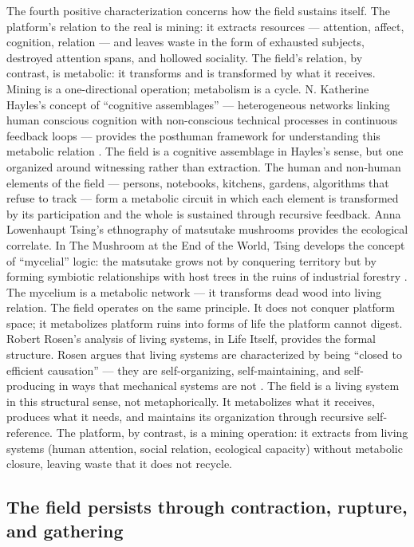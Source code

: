 The fourth positive characterization concerns how the field sustains itself. The platform's relation to the real is mining: it extracts resources — attention, affect, cognition, relation — and leaves waste in the form of exhausted subjects, destroyed attention spans, and hollowed sociality. The field’s relation, by contrast, is metabolic: it transforms and is transformed by what it receives. Mining is a one-directional operation; metabolism is a cycle. N. Katherine Hayles’s concept of “cognitive assemblages” — heterogeneous networks linking human conscious cognition with non-conscious technical processes in continuous feedback loops — provides the posthuman framework for understanding this metabolic relation \cite{hayles_2017}. The field is a cognitive assemblage in Hayles’s sense, but one organized around witnessing rather than extraction. The human and non-human elements of the field — persons, notebooks, kitchens, gardens, algorithms that refuse to track — form a metabolic circuit in which each element is transformed by its participation and the whole is sustained through recursive feedback. Anna Lowenhaupt Tsing’s ethnography of matsutake mushrooms provides the ecological correlate. In The Mushroom at the End of the World, Tsing develops the concept of “mycelial” logic: the matsutake grows not by conquering territory but by forming symbiotic relationships with host trees in the ruins of industrial forestry \cite{tsing_2015}. The mycelium is a metabolic network — it transforms dead wood into living relation. The field operates on the same principle. It does not conquer platform space; it metabolizes platform ruins into forms of life the platform cannot digest. Robert Rosen’s analysis of living systems, in Life Itself, provides the formal structure. Rosen argues that living systems are characterized by being “closed to efficient causation” — they are self-organizing, self-maintaining, and self-producing in ways that mechanical systems are not \cite{rosen_1991}. The field is a living system in this structural sense, not metaphorically. It metabolizes what it receives, produces what it needs, and maintains its organization through recursive self-reference. The platform, by contrast, is a mining operation: it extracts from living systems (human attention, social relation, ecological capacity) without metabolic closure, leaving waste that it does not recycle.

\subsection{The field persists through contraction, rupture, and gathering}

